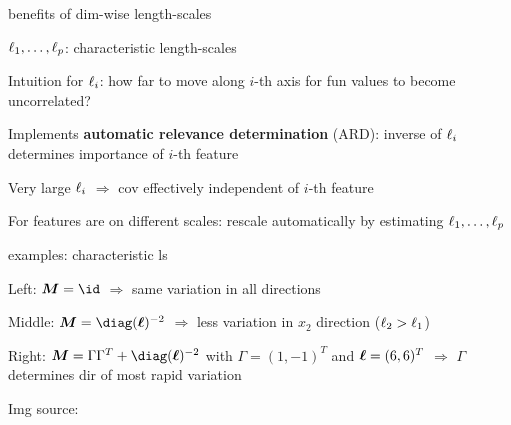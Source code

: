 \documentclass[11pt,compress,t,notes=noshow, xcolor=table]{beamer}
\begin{document}
\begin{framei}[sep=L]{benefits of dim-wise length-scales}
\item $\ell_1,\dots, \ell_p$: characteristic length-scales
\item Intuition for $\ell_i$: how far to move along $i$-th axis for fun values to become uncorrelated?
\item Implements \textbf{automatic relevance determination} (ARD): inverse of $\ell_i$ determines importance of $i$-th feature
\item Very large $\ell_i$ $\Rightarrow$ cov effectively independent of $i$-th feature
\item For features are on different scales: rescale automatically by estimating $\ell_1,\dots, \ell_p$ 
\end{framei}

\begin{framei}{examples: characteristic ls}
\item Left: $\bm{M} = \id$ $\Rightarrow$ same variation in all directions
\item Middle: $\bm{M} = \diag(\bm{\ls})^{-2}$ $\Rightarrow$ less variation in $x_2$ direction ($\ell_2 > \ell_1$)
\item Right: $\bm{M} = \Gamma \Gamma^T + \diag(\bm{\ls})^{-2}$ with $\Gamma = (1, -1)^T$ and $\bm{\ell} = (6, 6)^T$ $\Rightarrow$ $\Gamma$ determines dir of most rapid variation
\vfill
{}
\item Img source: 
\end{framei}

\endlecture
\end{document}
